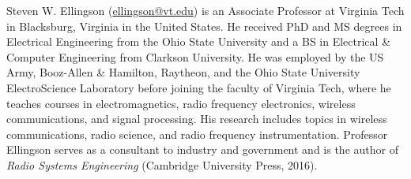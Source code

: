 

\label{m0153_Preface-About_Author} %

Steven W. Ellingson (\href{mailto:ellingson@vt.edu}{ellingson@vt.edu}) is an Associate Professor at Virginia Tech in Blacksburg, Virginia in the United States. 
He received PhD and MS degrees in Electrical Engineering from the Ohio State University and a BS in Electrical \& Computer Engineering from Clarkson University. He was employed by the US Army, Booz-Allen \& Hamilton, Raytheon, and the Ohio State University ElectroScience Laboratory before joining the faculty of Virginia Tech, where he teaches courses in electromagnetics, radio frequency electronics, wireless communications, and signal processing.
His research includes topics in wireless communications, radio science, and radio frequency instrumentation. 
Professor Ellingson serves as a consultant to industry and government and is the author of \emph{Radio Systems Engineering} (Cambridge University Press, 2016).


